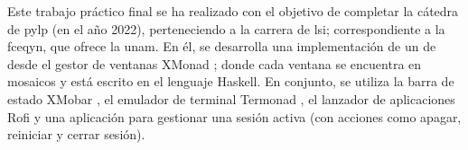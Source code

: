 \normalsize{ \indent
Este trabajo práctico final se ha realizado
con el objetivo de completar la cátedra de
\acrlong{pylp} (en el año 2022), perteneciendo
a la carrera de \acrlong{lsi}; correspondiente
a la \acrlong{fceqyn}, que ofrece la \acrlong{unam}.
}
\newline
\normalsize{ \indent
En él, se desarrolla una implementación de un \Gls{de}
desde el gestor de ventanas XMonad \cite{haskell_xmonad};
donde cada ventana se encuentra en mosaicos y está
escrito en el lenguaje Haskell. En conjunto, se utiliza
la barra de estado XMobar \cite{hackage_xmobar}, el
emulador de terminal Termonad \cite{hackage_termonad}, el
lanzador de aplicaciones Rofi \cite{rofi} y una aplicación
para gestionar una sesión activa (con acciones como apagar,
reiniciar y cerrar sesión).
}
